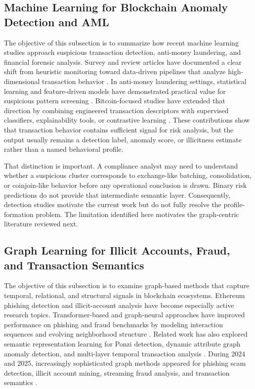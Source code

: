 \documentclass{ieeeaccess}
\begin{document}
\subsection{Machine Learning for Blockchain Anomaly Detection and AML}

The objective of this subsection is to summarize how recent machine learning studies approach suspicious transaction detection, anti-money laundering, and financial forensic analysis. Survey and review articles have documented a clear shift from heuristic monitoring toward data-driven pipelines that analyze high-dimensional transaction behavior \cite{ref1,ref2,ref3}. In anti-money laundering settings, statistical learning and feature-driven models have demonstrated practical value for suspicious pattern screening \cite{ref4,ref5}. Bitcoin-focused studies have extended that direction by combining engineered transaction descriptors with supervised classifiers, explainability tools, or contrastive learning \cite{ref8,ref21,ref22,ref30}. These contributions show that transaction behavior contains sufficient signal for risk analysis, but the output usually remains a detection label, anomaly score, or illicitness estimate rather than a named behavioral profile.

That distinction is important. A compliance analyst may need to understand whether a suspicious cluster corresponds to exchange-like batching, consolidation, or coinjoin-like behavior before any operational conclusion is drawn. Binary risk predictions do not provide that intermediate semantic layer. Consequently, detection studies motivate the current work but do not fully resolve the profile-formation problem. The limitation identified here motivates the graph-centric literature reviewed next.

\subsection{Graph Learning for Illicit Accounts, Fraud, and Transaction Semantics}

The objective of this subsection is to examine graph-based methods that capture temporal, relational, and structural signals in blockchain ecosystems. Ethereum phishing detection and illicit-account analysis have become especially active research topics. Transformer-based and graph-neural approaches have improved performance on phishing and fraud benchmarks by modeling interaction sequences and evolving neighborhood structure \cite{ref9,ref10,ref11,ref12,ref13}. Related work has also explored semantic representation learning for Ponzi detection, dynamic attribute graph anomaly detection, and multi-layer temporal transaction analysis \cite{ref14,ref15,ref16,ref17}. During 2024 and 2025, increasingly sophisticated graph methods appeared for phishing scam detection, illicit account mining, streaming fraud analysis, and transaction semantics \cite{ref18,ref19,ref20,ref24,ref25,ref26,ref27,ref28,ref29,ref31,ref32,ref33,ref34,ref35}.
\end{document}
